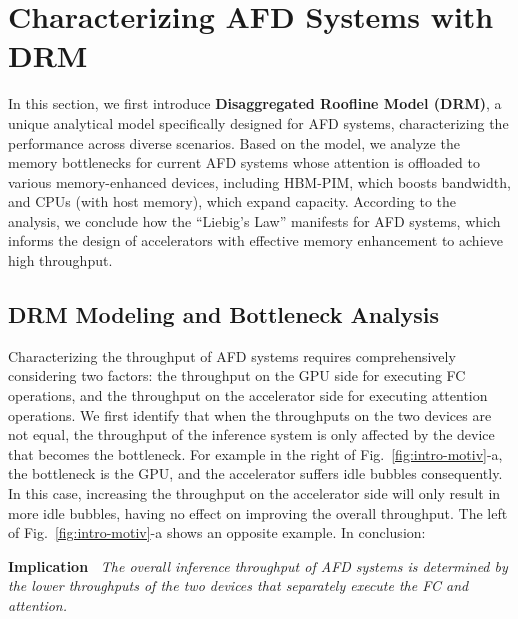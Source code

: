 \section{Characterizing AFD Systems with DRM}
\label{s:demys}
In this section, we first introduce \textbf{Disaggregated Roofline Model (DRM)}, a unique analytical model specifically designed for AFD systems, characterizing the performance across diverse scenarios.
Based on the model, we analyze the memory bottlenecks for current AFD systems whose attention is offloaded to various memory-enhanced devices, 
including HBM-PIM, which boosts bandwidth, and CPUs (with host memory), which expand capacity.
According to the analysis, we conclude how the ``Liebig's Law'' manifests for AFD systems, 
which informs the design of accelerators with effective memory enhancement to achieve high throughput.













\subsection{DRM Modeling and Bottleneck Analysis}
\label{s:motiv-analytic-model}
Characterizing the throughput of AFD systems requires comprehensively considering two factors: 
the throughput on the GPU side for executing FC operations, 
and the throughput on the accelerator side for executing attention operations.
We first identify that when the throughputs on the two devices are not equal, the throughput of the inference system is only affected by the device that becomes the bottleneck.
For example in the right of Fig.~\ref{fig:intro-motiv}-a, the bottleneck is the GPU, and the accelerator suffers idle bubbles consequently.
In this case, increasing the throughput on the accelerator side will only result in more idle bubbles, having no effect on improving the overall throughput.
The left of Fig.~\ref{fig:intro-motiv}-a shows an opposite example.
In conclusion:


\begin{mdframed}[backgroundcolor=gray!10,linecolor=black,linewidth=1pt]
\textbf{Implication~\uppercase\expandafter{}} 
\textit{The overall inference throughput of AFD systems is determined by the lower throughputs of the two devices that separately execute the FC and attention.
}
\end{mdframed}


